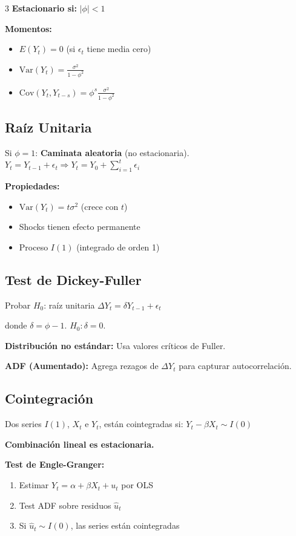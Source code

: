 \documentclass[9pt, spanish, twoside]{article}
\newcommand{\critical}[1]{\textcolor{CriticalRed}{\textbf{#1}}}
\newcommand{\eqbox}[1]{\colorbox{TitaniumGray}{$\displaystyle #1$}}
\begin{document}
\begin{multicols*}{3}
\textbf{Estacionario si:} $|\phi| < 1$

\textbf{Momentos:}
\begin{itemize}[leftmargin=8pt, noitemsep, topsep=2pt]
    \item $E(Y_t) = 0$ (si $\epsilon_t$ tiene media cero)
    \item $\text{Var}(Y_t) = \frac{\sigma^2}{1-\phi^2}$
    \item $\text{Cov}(Y_t, Y_{t-s}) = \phi^s \frac{\sigma^2}{1-\phi^2}$
\end{itemize}

\subsection{Raíz Unitaria}
Si $\phi = 1$: \critical{Caminata aleatoria} (no estacionaria).
$Y_t = Y_{t-1} + \epsilon_t \Rightarrow Y_t = Y_0 + \sum_{i=1}^t \epsilon_i$

\textbf{Propiedades:}
\begin{itemize}[leftmargin=8pt, noitemsep, topsep=2pt]
    \item $\text{Var}(Y_t) = t\sigma^2$ (crece con $t$)
    \item Shocks tienen efecto permanente
    \item Proceso $I(1)$ (integrado de orden 1)
\end{itemize}

\subsection{Test de Dickey-Fuller}
Probar $H_0$: raíz unitaria
$\Delta Y_t = \delta Y_{t-1} + \epsilon_t$

donde $\delta = \phi - 1$. $H_0: \delta = 0$.

\critical{Distribución no estándar:} Usa valores críticos de Fuller.

\textbf{ADF (Aumentado):} Agrega rezagos de $\Delta Y_t$ para capturar autocorrelación.

\subsection{Cointegración}
Dos series $I(1)$, $X_t$ e $Y_t$, están cointegradas si:
\eqbox{Y_t - \beta X_t \sim I(0)}

\critical{Combinación lineal es estacionaria.}

\textbf{Test de Engle-Granger:}
\begin{enumerate}[leftmargin=8pt, noitemsep, topsep=2pt]
    \item Estimar $Y_t = \alpha + \beta X_t + u_t$ por OLS
    \item Test ADF sobre residuos $\hat{u}_t$
    \item Si $\hat{u}_t \sim I(0)$, las series están cointegradas
\end{enumerate}


\end{multicols*}
\end{document}
